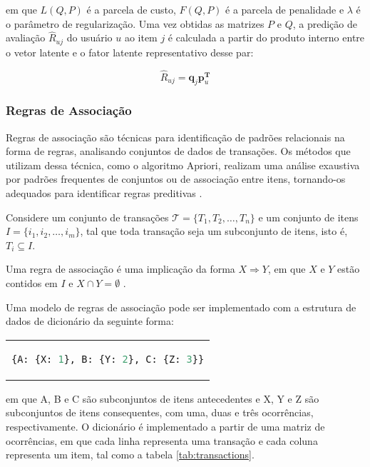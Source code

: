 em que $L(Q,P)$ é a parcela de custo, $F(Q,P)$ é a parcela de penalidade e
$\lambda$ é o parâmetro de regularização. Uma vez obtidas as matrizes $P$ e $Q$,
a predição de avaliação $\hat{R}_{uj}$ do usuário $u$ ao item $j$ é calculada a
partir do produto interno entre o vetor latente e o fator latente representativo
desse par:

\begin{equation} \label{fator_latente}
    \hat{R}_{uj} = \mathbf{q}_j \mathbf{p}_u^{\mathbf{T}}
\end{equation}

\subsubsection{Regras de Associação}
Regras de associação são técnicas para identificação de padrões relacionais
na forma de regras, analisando conjuntos de dados de transações. Os métodos que
utilizam dessa técnica, como o algoritmo Apriori, realizam uma análise exaustiva
por padrões frequentes de conjuntos ou de associação entre itens, tornando-os
adequados para identificar regras preditivas \cite{jannach2011recommender}.

Considere um conjunto de transações $\mathcal{T} = \{T_1, T_2, \dots, T_n\}$ e
um conjunto de itens $I = \{i_1, i_2, \dots, i_m\}$, tal que toda transação seja
um subconjunto de itens, isto é, $T_i \subseteq I$.

Uma regra de associação é uma
implicação da forma $X \Rightarrow Y$, em que $X$ e $Y$ estão contidos em $I$ e
$X \cap Y = \emptyset$ \cite{ordonez2011evaluating}.

Uma modelo de regras de associação
pode ser implementado com a estrutura de dados de dicionário da seguinte forma:

\begin{center}
    \begin{tabular}{c}

\begin{lstlisting}[language=Python]
    {A: {X: 1}, B: {Y: 2}, C: {Z: 3}}
\end{lstlisting}
\end{tabular}
\end{center}
em que A, B e C são subconjuntos de itens antecedentes e X, Y e Z são
subconjuntos de itens consequentes, com uma, duas e três ocorrências,
respectivamente. O dicionário é implementado a partir de uma matriz de ocorrências,
em que cada linha representa uma transação e cada coluna representa um item, tal
como a tabela \ref{tab:transactions}.

